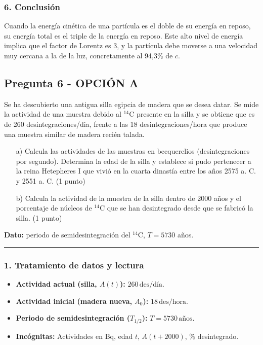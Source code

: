 \subsubsection*{6. Conclusión}
\begin{cajaconclusion}
Cuando la energía cinética de una partícula es el doble de su energía en reposo, su energía total es el triple de la energía en reposo. Este alto nivel de energía implica que el factor de Lorentz es 3, y la partícula debe moverse a una velocidad muy cercana a la de la luz, concretamente al 94,3\% de $c$.
\end{cajaconclusion}
\newpage

\subsection{Pregunta 6 - OPCIÓN A}
\label{subsec:6A_2018_jul_ext}
\begin{cajaenunciado}
Se ha descubierto una antigua silla egipcia de madera que se desea datar. Se mide la actividad de una muestra debido al $^{14}\text{C}$ presente en la silla y se obtiene que es de 260 desintegraciones/dia, frente a las 18 desintegraciones/hora que produce una muestra similar de madera recién talada.
\begin{enumerate}
    \item[a)] Calcula las actividades de las muestras en becquerelios (desintegraciones por segundo). Determina la edad de la silla y establece si pudo pertenecer a la reina Hetepheres I que vivió en la cuarta dinastía entre los años 2575 a. C. y 2551 a. C. (1 punto)
    \item[b)] Calcula la actividad de la muestra de la silla dentro de 2000 años y el porcentaje de núcleos de $^{14}\text{C}$ que se han desintegrado desde que se fabricó la silla. (1 punto)
\end{enumerate}
\textbf{Dato:} periodo de semidesintegración del $^{14}\text{C}$, $T=5730$ años.
\end{cajaenunciado}
\hrule
\subsubsection*{1. Tratamiento de datos y lectura}
\begin{itemize}
    \item \textbf{Actividad actual (silla, $A(t)$):} $260\,\text{des/día}$.
    \item \textbf{Actividad inicial (madera nueva, $A_0$):} $18\,\text{des/hora}$.
    \item \textbf{Periodo de semidesintegración ($T_{1/2}$):} $T=5730\,\text{años}$.
    \item \textbf{Incógnitas:} Actividades en Bq, edad $t$, $A(t+2000)$, \% desintegrado.
\end{itemize}
